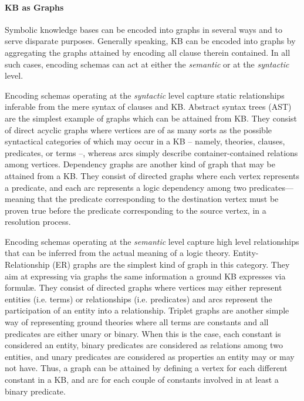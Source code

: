 \documentclass[12pt,a4paper,openright,twoside]{book}
\begin{document}
\paragraph{KB as Graphs}

Symbolic knowledge bases can be encoded into graphs in several ways and to serve disparate purposes.
%
Generally speaking, KB can be encoded into graphs by aggregating the graphs attained by encoding all clause therein contained.
%
In all such cases, encoding schemas can act at either the \emph{semantic} or at the \emph{syntactic} level.

Encoding schemas operating at the \emph{syntactic} level capture static relationships inferable from the mere syntax of clauses and KB.
%
Abstract syntax trees (AST) are the simplest example of graphs which can be attained from KB.
%
They consist of direct acyclic graphs where vertices are of as many sorts as the possible syntactical categories of which may occur in a KB -- namely, theories, clauses, predicates, or terms --, whereas arcs simply describe container-contained relations among vertices.
%
Dependency graphs are another kind of graph that may be attained from a KB.
%
They consist of directed graphs where each vertex represents a predicate, and each arc represents a logic dependency among two predicates---meaning that the predicate corresponding to the destination vertex must be proven true before the predicate corresponding to the source vertex, in a resolution process.

Encoding schemas operating at the \emph{semantic} level capture high level relationships that can be inferred from the actual meaning of a logic theory.
%
Entity-Relationship (ER) graphs are the simplest kind of graph in this category.
%
They aim at expressing via graphs the same information a ground KB expresses via formul\ae{}.
%
They consist of directed graphs where vertices may either represent entities (i.e. terms) or relationships (i.e. predicates) and arcs represent the participation of an entity into a relationship.
%
Triplet graphs are another simple way of representing ground theories where all terms are constants and all predicates are either unary or binary.
%
When this is the case, each constant is considered an entity, binary predicates are considered as relations among two entities, and unary predicates are considered as properties an entity may or may not have.
%
Thus, a graph can be attained by defining a vertex for each different constant in a KB, and arc for each couple of constants involved in at least a binary predicate.
\end{document}
